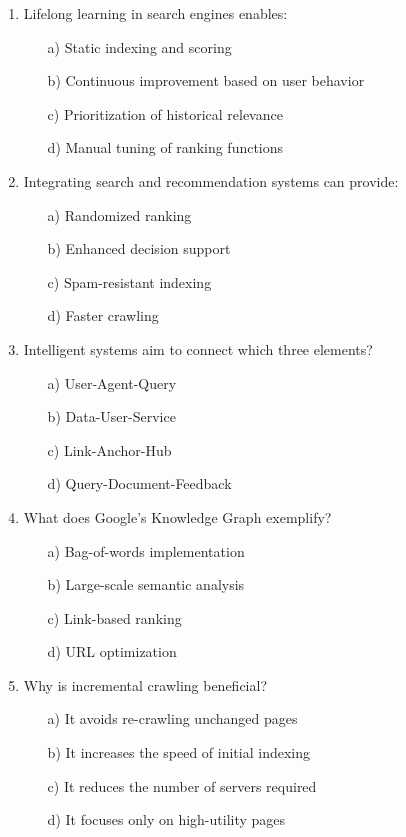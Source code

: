 \documentclass[8pt]{extarticle}
\begin{document}
\begin{multicols}{2}
\begin{enumerate}
\item Lifelong learning in search engines enables:
\begin{itemize}
\item[a)] Static indexing and scoring
\item[b)] Continuous improvement based on user behavior
\item[c)] Prioritization of historical relevance
\item[d)] Manual tuning of ranking functions
\end{itemize}

\item Integrating search and recommendation systems can provide:
\begin{itemize}
\item[a)] Randomized ranking
\item[b)] Enhanced decision support
\item[c)] Spam-resistant indexing
\item[d)] Faster crawling
\end{itemize}

\item Intelligent systems aim to connect which three elements?
\begin{itemize}
\item[a)] User-Agent-Query
\item[b)] Data-User-Service
\item[c)] Link-Anchor-Hub
\item[d)] Query-Document-Feedback
\end{itemize}

\item What does Google's Knowledge Graph exemplify?
\begin{itemize}
\item[a)] Bag-of-words implementation
\item[b)] Large-scale semantic analysis
\item[c)] Link-based ranking
\item[d)] URL optimization
\end{itemize}

\item Why is incremental crawling beneficial?
\begin{itemize}
\item[a)] It avoids re-crawling unchanged pages
\item[b)] It increases the speed of initial indexing
\item[c)] It reduces the number of servers required
\item[d)] It focuses only on high-utility pages
\end{itemize}


\end{enumerate}
\end{multicols}
\end{document}
